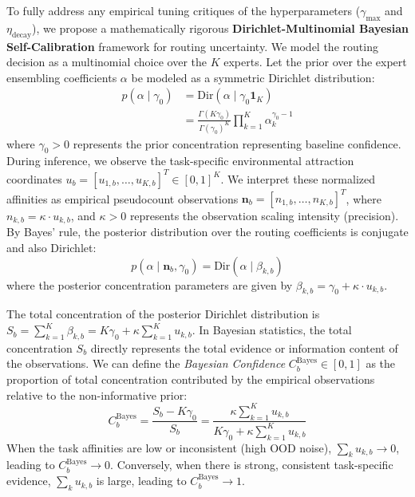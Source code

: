 \begin{enumerate}
    To fully address any empirical tuning critiques of the hyperparameters ($\gamma_{\max}$ and $\eta_{\text{decay}}$), we propose a mathematically rigorous \textbf{Dirichlet-Multinomial Bayesian Self-Calibration} framework for routing uncertainty. We model the routing decision as a multinomial choice over the $K$ experts. Let the prior over the expert ensembling coefficients $\alpha$ be modeled as a symmetric Dirichlet distribution:
    \begin{align}
        p(\alpha \mid \gamma_0) &= \text{Dir}(\alpha \mid \gamma_0 \mathbf{1}_K) \nonumber \\
        &= \frac{\Gamma(K \gamma_0)}{\Gamma(\gamma_0)^K} \prod_{k=1}^K \alpha_k^{\gamma_0 - 1}
    \end{align}
    where $\gamma_0 > 0$ represents the prior concentration representing baseline confidence. During inference, we observe the task-specific environmental attraction coordinates $u_{b} = [u_{1,b}, \dots, u_{K,b}]^T \in [0, 1]^K$. We interpret these normalized affinities as empirical pseudocount observations $\mathbf{n}_b = [n_{1,b}, \dots, n_{K,b}]^T$, where $n_{k,b} = \kappa \cdot u_{k,b}$, and $\kappa > 0$ represents the observation scaling intensity (precision). By Bayes' rule, the posterior distribution over the routing coefficients is conjugate and also Dirichlet:
    \begin{equation}
        p(\alpha \mid \mathbf{n}_b, \gamma_0) = \text{Dir}(\alpha \mid \beta_{k,b})
    \end{equation}
    where the posterior concentration parameters are given by $\beta_{k,b} = \gamma_0 + \kappa \cdot u_{k,b}$.
    
    The total concentration of the posterior Dirichlet distribution is $S_b = \sum_{k=1}^K \beta_{k,b} = K \gamma_0 + \kappa \sum_{k=1}^K u_{k,b}$. In Bayesian statistics, the total concentration $S_b$ directly represents the total evidence or information content of the observations. We can define the \emph{Bayesian Confidence} $C^{\text{Bayes}}_b \in [0, 1]$ as the proportion of total concentration contributed by the empirical observations relative to the non-informative prior:
    \begin{equation}
        C^{\text{Bayes}}_b = \frac{S_b - K \gamma_0}{S_b} = \frac{\kappa \sum_{k=1}^K u_{k,b}}{K \gamma_0 + \kappa \sum_{k=1}^K u_{k,b}}
    \end{equation}
    When the task affinities are low or inconsistent (high OOD noise), $\sum_k u_{k,b} \to 0$, leading to $C^{\text{Bayes}}_b \to 0$. Conversely, when there is strong, consistent task-specific evidence, $\sum_k u_{k,b}$ is large, leading to $C^{\text{Bayes}}_b \to 1$.
    

\end{enumerate}
